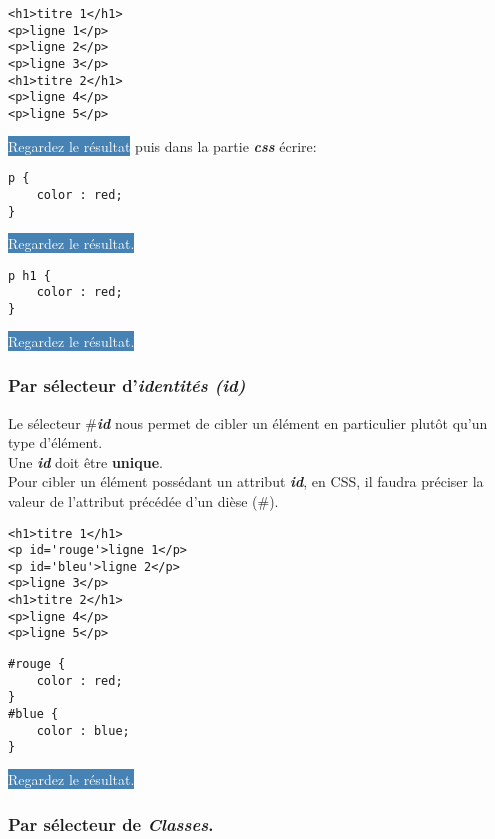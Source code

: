 \documentclass[10pt,dvipsnames, dvips, svgnames]{article}
\begin{document}
\begin{lstlisting}
<h1>titre 1</h1>
<p>ligne 1</p>
<p>ligne 2</p>
<p>ligne 3</p>
<h1>titre 2</h1>
<p>ligne 4</p>
<p>ligne 5</p>
\end{lstlisting}

\colorbox{SteelBlue}{\textcolor{white}{Regardez le résultat}} puis dans la partie \textbf{\textit{css}} écrire:

\begin{lstlisting}
p {
	color : red;
}
\end{lstlisting}

\colorbox{SteelBlue}{\textcolor{white}{Regardez le résultat.}}


\begin{lstlisting}
p h1 {
	color : red;
}
\end{lstlisting}

\colorbox{SteelBlue}{\textcolor{white}{Regardez le résultat.}}

\subsubsection{Par sélecteur d'\textbf{\textit{identités (id)}}}

Le sélecteur \string#\textbf{\textit{id}} nous permet de cibler un élément en particulier   plutôt qu'un type d'élément.\\
Une \textbf{\textit{id}} doit être \textbf{unique}.\\
Pour cibler un élément possédant un attribut \textbf{\textit{id}}, en CSS, il faudra préciser la valeur de l'attribut précédée d'un dièse (\string#).


\begin{lstlisting}
<h1>titre 1</h1>
<p id='rouge'>ligne 1</p>
<p id='bleu'>ligne 2</p>
<p>ligne 3</p>
<h1>titre 2</h1>
<p>ligne 4</p>
<p>ligne 5</p>
\end{lstlisting}

\begin{lstlisting}
#rouge {
	color : red;
}
#blue {
	color : blue;
}
\end{lstlisting}

\colorbox{SteelBlue}{\textcolor{white}{Regardez le résultat.}}



\subsubsection{Par sélecteur de \textbf{\textit{Classes}}.}
\end{document}
